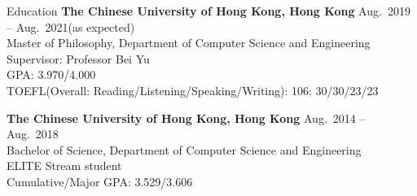 

\begin{rSection}{Education}
{\bf The Chinese University of Hong Kong, Hong Kong} \hfill {Aug.~2019 -- Aug.~2021(as expected)} \\ 
Master of Philosophy, Department of Computer Science and Engineering \\
Supervisor: Professor Bei Yu \\
GPA: 3.970/4.000 \\
TOEFL(Overall: Reading/Listening/Speaking/Writing): 106: 30/30/23/23

{\bf The Chinese University of Hong Kong, Hong Kong} \hfill {Aug.~2014 -- Aug.~2018} \\ 
Bachelor of Science, Department of Computer Science and Engineering \\
ELITE Stream student \\
Cumulative/Major GPA: 3.529/3.606
\end{rSection}




